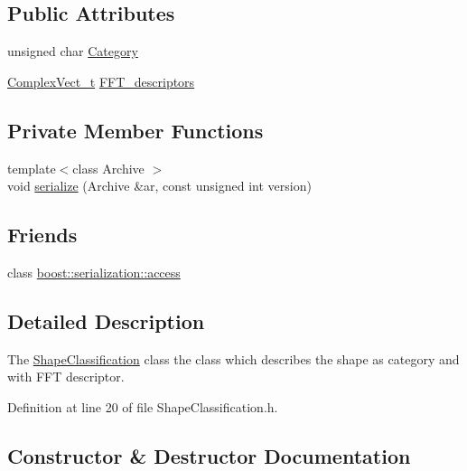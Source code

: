 \subsection*{Public Attributes}
\begin{DoxyCompactItemize}
\item 
unsigned char \hyperlink{class_shape_classification_a5b723e358b86496ed6f4b25e2bf7af17}{Category}
\item 
\hyperlink{_soil_math_types_8h_a7567e521c2b2c408dcb62dbff72390f7}{Complex\+Vect\+\_\+t} \hyperlink{class_shape_classification_afecc3c98ca8a930b359ddd936aad21f3}{F\+F\+T\+\_\+descriptors}
\end{DoxyCompactItemize}
\subsection*{Private Member Functions}
\begin{DoxyCompactItemize}
\item 
{\footnotesize template$<$class Archive $>$ }\\void \hyperlink{class_shape_classification_a6a66482eaf1503a83a0b61ceaa6f7214}{serialize} (Archive \&ar, const unsigned int version)
\end{DoxyCompactItemize}
\subsection*{Friends}
\begin{DoxyCompactItemize}
\item 
class \hyperlink{class_shape_classification_ac98d07dd8f7b70e16ccb9a01abf56b9c}{boost\+::serialization\+::access}
\end{DoxyCompactItemize}


\subsection{Detailed Description}
The \hyperlink{class_shape_classification}{Shape\+Classification} class the class which describes the shape as category and with F\+F\+T descriptor. 

Definition at line 20 of file Shape\+Classification.\+h.



\subsection{Constructor \& Destructor Documentation}
\hypertarget{class_shape_classification_a53cff8a411773e7e36c5afabe3ad5ec3}{}
